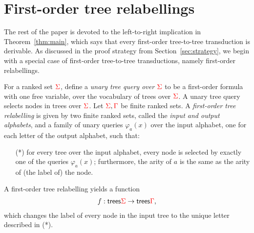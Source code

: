 \section{First-order tree relabellings}\label{sec:fo-translation}
The rest of the paper is devoted to the left-to-right implication in Theorem~\ref{thm:main}, which says that every first-order tree-to-tree transduction is derivable. As discussed in the proof strategy from Section~\ref{sec:strategy}, we begin with a special case of first-order tree-to-tree transductions, namely first-order relabellings. 


\begin{definition} \label{def:forat} For a ranked set ${\color{red}{\Sigma}}$, define a \emph{unary tree query over ${\color{red}{\Sigma}}$} to be a first-order formula with one free variable, over the vocabulary of trees over ${\color{red}{\Sigma}}$. A unary tree query selects nodes in trees over ${\color{red}{\Sigma}}$.  Let ${\color{red}{\Sigma}}, {\color{red}{\Gamma}}$ be finite ranked sets. A \emph{first-order tree relabelling} is given by two finite ranked sets, called the \emph{input and output alphabets}, and a family of unary queries $\varphi_a(x)$ over the input alphabet, one for each letter of the output alphabet, such that:
    \begin{enumerate}
        \item[(*)] for every tree over the input alphabet, every node is selected by exactly one of the queries $\varphi_a(x)$; furthermore, the arity of $a$ is the same as the arity of (the label of) the node. 
    \end{enumerate}
A first-order tree relabelling yields a function
\begin{align*}
f : \mathsf {trees} {\color{red}{\Sigma}} \to \mathsf {trees} {\color{red}{\Gamma}},
\end{align*}
which changes the label of every node in the input tree to the unique letter described in  (*). 
      \end{definition}


